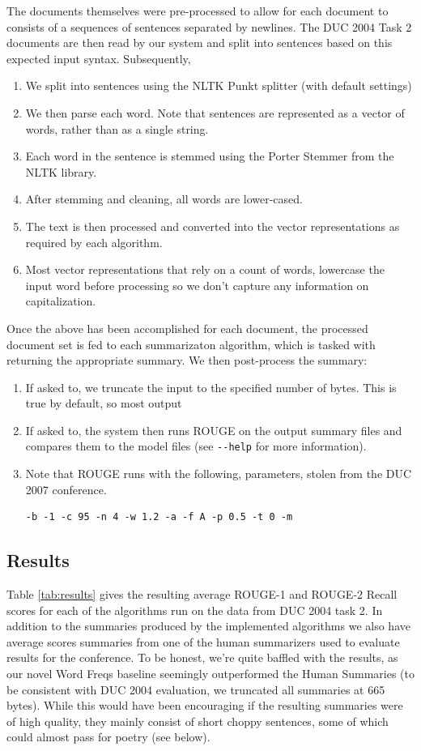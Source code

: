 \documentclass[10pt]{article}
\begin{document}
The documents themselves were pre-processed to allow for each document to consists of a sequences of sentences separated by newlines. The DUC 2004 Task 2 documents are then read by our system and split into sentences based on this expected input syntax. Subsequently,
\begin{enumerate}
\item We split into sentences using the NLTK Punkt splitter (with default settings)
\item We then parse each word. Note that sentences are represented as a vector of words, rather than as a single string.
\item Each word in the sentence is stemmed using the Porter Stemmer from the NLTK library.
\item After stemming and cleaning, all words are lower-cased.
\item The text is then processed and converted into the vector representations as required by each algorithm.
\item Most vector representations that rely on a count of words, lowercase the input word before processing so we don't capture any information on capitalization.
\end{enumerate}

Once the above has been accomplished for each document, the processed document set is fed to each summarizaton algorithm, which is tasked with returning the appropriate summary. We then post-process the summary:
\begin{enumerate}
\item If asked to, we truncate the input to the specified number of bytes. This is true by default, so most output
\item If asked to, the system then runs ROUGE on the output summary files and compares them to the model files (see \verb|--help| for more information).
\item Note that ROUGE runs with the following, parameters, stolen from the DUC 2007 conference.
\begin{verbatim}
-b -1 -c 95 -n 4 -w 1.2 -a -f A -p 0.5 -t 0 -m
\end{verbatim}
\end{enumerate}

\subsection{Results}
Table \ref{tab:results} gives the resulting average ROUGE-1 and ROUGE-2 Recall scores for each of the algorithms run on the data from DUC 2004 task 2. In addition to the summaries produced by the implemented algorithms we also have average scores summaries from one of the human summarizers used to evaluate results for the conference. To be honest, we're quite baffled with the results, as our novel Word Freqs baseline seemingly outperformed the Human Summaries (to be consistent with DUC 2004 evaluation, we truncated all summaries at 665 bytes). While this would have been encouraging if the resulting summaries were of high quality, they mainly consist of short choppy sentences, some of which could almost pass for poetry (see below).
\end{document}
